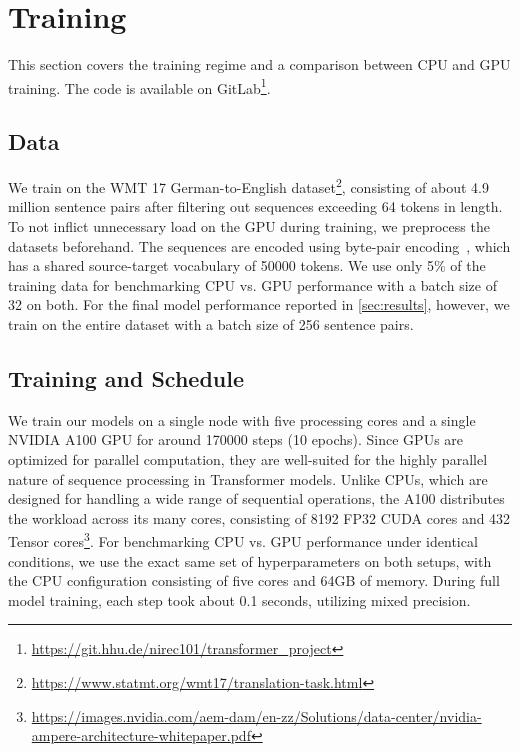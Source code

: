 \section{Training}
This section covers the training regime and a comparison between CPU and GPU training.
The code is available on GitLab\footnote{\url{https://git.hhu.de/nirec101/transformer_project}}.

\subsection{Data}
We train on the WMT 17 German-to-English dataset\footnote{\url{https://www.statmt.org/wmt17/translation-task.html}}, consisting of about 4.9 million sentence pairs after filtering out sequences exceeding 64 tokens in length.
To not inflict unnecessary load on the GPU during training, we preprocess the datasets beforehand.
The sequences are encoded using byte-pair encoding~\cite{britz2017massiveexplorationneuralmachine}, which has a shared source-target vocabulary of 50000 tokens.
We use only 5\% of the training data for benchmarking CPU vs. GPU performance with a batch size of 32 on both.
For the final model performance reported in \cref{sec:results}, however, we train on the entire dataset with a batch size of 256 sentence pairs.

\subsection{Training and Schedule}
We train our models on a single node with five processing cores and a single NVIDIA A100 GPU for around 170000 steps (10 epochs).
Since GPUs are optimized for parallel computation, they are well-suited for the highly parallel nature of sequence processing in Transformer models.
Unlike CPUs, which are designed for handling a wide range of sequential operations, the A100 distributes the workload across its many cores, consisting of 8192 FP32 CUDA cores and 432 Tensor cores\footnote{\url{https://images.nvidia.com/aem-dam/en-zz/Solutions/data-center/nvidia-ampere-architecture-whitepaper.pdf}}.
For benchmarking CPU vs. GPU performance under identical conditions, we use the exact same set of hyperparameters on both setups, with the CPU configuration consisting of five cores and 64GB of memory.
During full model training, each step took about 0.1 seconds, utilizing mixed precision.


